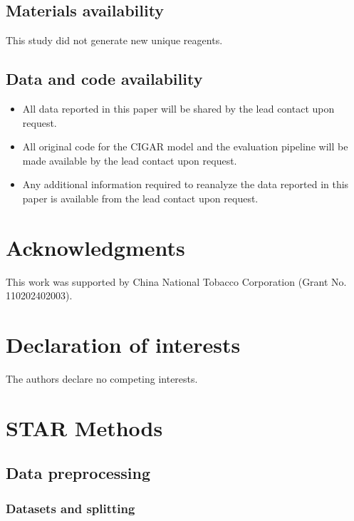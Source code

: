 ﻿\documentclass[a4paper,fleqn]{cas-sc}
\begin{document}
\subsection{Materials availability}

This study did not generate new unique reagents.

\subsection{Data and code availability}

\begin{itemize}
    \item All data reported in this paper will be shared by the lead contact upon request.
    \item All original code for the CIGAR model and the evaluation pipeline will be made available by the lead contact upon request.
    \item Any additional information required to reanalyze the data reported in this paper is available from the lead contact upon request.
\end{itemize}

\section{Acknowledgments}

This work was supported by China National Tobacco Corporation (Grant No. 110202402003).

\section{Declaration of interests}

The authors declare no competing interests.



\section{STAR Methods}

\subsection{Data preprocessing}

\subsubsection{Datasets and splitting}
\end{document}
